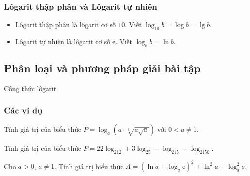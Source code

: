 \subsubsection{Lôgarit thập phân và Lôgarit tự nhiên}
\begin{itemize}
	\item Lôgarit thập phân là lôgarit cơ số $10$. Viết $\log_{10}b=\log b=\lg b$.
	\item Lôgarit tự nhiên là lôgarit cơ số $\mathrm{e}$. Viết $\log_{\mathrm{e}}b=\ln b$.
\end{itemize}
\subsection{Phân loại và phương pháp giải bài tập}
\begin{dang}{Công thức lôgarit}
\end{dang}
\subsubsection{Các ví dụ}
\begin{vd}%
	Tính giá trị của biểu thức $P=\log_a\left(a\cdot\sqrt[3]{a\sqrt{a}}\right)$ với $0<a\neq 1$.
\end{vd}

\begin{vd}%
	Tính giá trị của biểu thức $P=22\log_212+3\log_25-\log_215-\log_2150$.
\end{vd}

\begin{vd}%
	Cho $a>0$, $a\neq 1$. Tính giá trị biểu thức $A=(\ln a+\log_a\mathrm{e})^2+\ln ^2a-\log_a^2\mathrm{e}$.
\end{vd}

